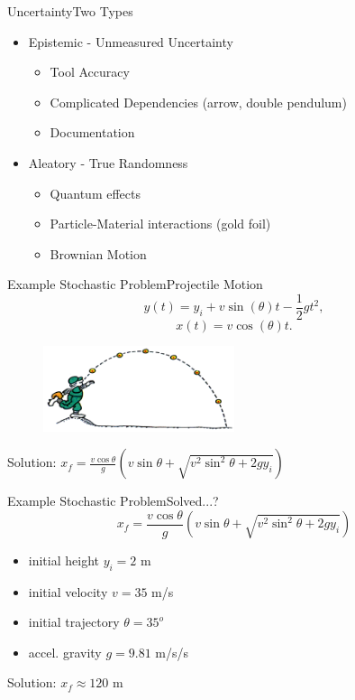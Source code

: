 \documentclass{beamer}
\begin{document}
\begin{frame}{Uncertainty}{Two Types}\vspace{-30pt}
\begin{itemize}
\item Epistemic - Unmeasured Uncertainty
  \begin{itemize}
  \item Tool Accuracy
  \item Complicated Dependencies (arrow, double pendulum)
  \item Documentation
  \end{itemize}\vspace{20pt}
\item Aleatory - True Randomness
\begin{itemize}
  \item Quantum effects
  \item Particle-Material interactions (gold foil)
  \item Brownian Motion
\end{itemize}
\end{itemize}
\end{frame}

\begin{frame}{Example Stochastic Problem}{Projectile Motion}\vspace{-30pt}
\begin{equation*}
y(t)=y_i + v\sin(\theta)t - \frac{1}{2}gt^2,
\end{equation*}
\begin{equation*}
x(t)=v\cos(\theta)t.
\end{equation*}
  \begin{figure}[h!]
    \centering
      \includegraphics[width=0.5\textwidth]{../graphics/projectile}
  \end{figure}
\vspace{-10pt}
Solution: $x_f=\frac{v\cos{\theta}}{g}\left(v\sin\theta+\sqrt{v^2\sin^2\theta + 2gy_i}\right)$
\end{frame}

\begin{frame}{Example Stochastic Problem}{Solved...?}\vspace{-50pt}
\begin{equation*}
x_f=\frac{v\cos{\theta}}{g}\left(v\sin\theta+\sqrt{v^2\sin^2\theta + 2gy_i}\right)
\end{equation*}
\begin{itemize}
\item initial height $y_i = 2$ m
\item initial velocity $v = 35$ m/s
\item initial trajectory $\theta = 35^o$
\item accel. gravity $g = 9.81$ m/s/s
\end{itemize}
Solution: $x_f\approx120$ m
\end{frame}
\end{document}
